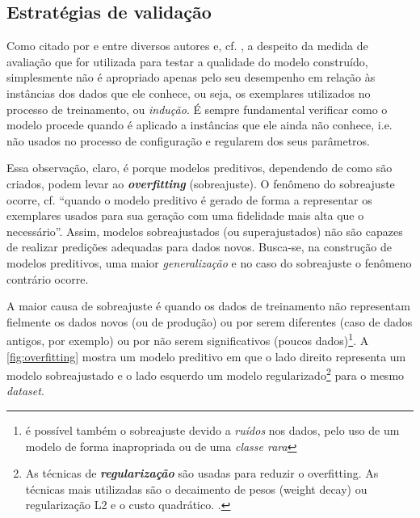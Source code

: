 \subsection{Estratégias de validação}\label{estrategias_validacao}
Como citado por  e  entre diversos autores e, cf. , a despeito da medida de avaliação que for utilizada para testar a qualidade do modelo construído, simplesmente não é apropriado apenas pelo seu desempenho em relação às instâncias dos dados que ele conhece, ou seja, os exemplares utilizados no processo de treinamento, ou \textit{indução}. É sempre fundamental verificar como o modelo procede quando é aplicado a instâncias que ele ainda não conhece, i.e. não usados no processo de configuração e regularem dos seus parâmetros.

Essa observação, claro, é porque modelos preditivos, dependendo de como são criados, podem levar ao \textit{\textbf{overfitting}} (sobreajuste). O fenômeno do sobreajuste ocorre, cf.  ``quando o modelo preditivo é gerado de forma a representar os exemplares usados para sua geração com uma fidelidade mais alta que o necessário''. Assim, modelos sobreajustados (ou superajustados) não são capazes de realizar predições adequadas para dados novos. Busca-se, na construção de modelos preditivos, uma maior \textit{generalização} e no caso do sobreajuste o fenômeno contrário ocorre. 

A maior causa de sobreajuste é quando os dados de treinamento não representam fielmente os dados novos (ou de produção) ou por serem diferentes (caso de dados antigos, por exemplo) ou por não serem significativos (poucos dados)\footnote{ é possível também o sobreajuste devido a \textit{ruídos} nos dados, pelo uso de um modelo de forma inapropriada ou de uma \textit{classe rara} }. A \autoref{fig:overfitting} mostra um modelo preditivo em que o lado direito representa um modelo sobreajustado e o lado esquerdo um modelo regularizado\footnote{As técnicas de \textbf{\textit{regularização}} são usadas para reduzir o overfitting. As técnicas mais utilizadas são o decaimento de pesos (weight decay) ou regularização L2 e o custo quadrático. \cite{deep_learning_book_2019}.} para o mesmo \textit{dataset}.


